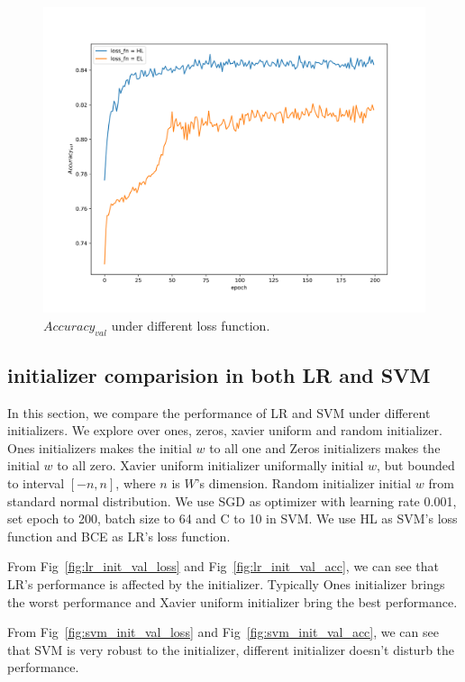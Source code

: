 \documentclass[journal, a4paper]{IEEEtran}
\begin{document}
\begin{figure}[!hbt]
	\begin{center}
		\includegraphics[width=\columnwidth]{l_val_acc}
		\caption{$Accuracy_{val}$ under different loss function.}
		\label{fig:l_val_acc}
	\end{center}
\end{figure} \par

\subsection{initializer comparision in both LR and SVM}
In this section, we compare the performance of LR and SVM under different initializers. We explore over ones, zeros, xavier uniform and random initializer. Ones initializers makes the initial $w$ to all one and Zeros initializers makes the initial $w$ to all zero. Xavier uniform initializer uniformally initial $w$, but bounded to interval $[-n, n]$, where $n$ is $W$'s dimension. Random initializer initial $w$ from standard normal distribution. We use SGD as optimizer with learning rate 0.001, set epoch to 200, batch size to 64 and C to 10 in SVM. We use HL as SVM's loss function and BCE as LR's loss function.\par
From Fig~\ref{fig:lr_init_val_loss} and Fig~\ref{fig:lr_init_val_acc}, we can see that LR's performance is affected by the initializer. Typically Ones initializer brings the worst performance and Xavier uniform initializer bring the best performance. \par
From Fig~\ref{fig:svm_init_val_loss} and Fig~\ref{fig:svm_init_val_acc}, we can see that SVM is very robust to the initializer, different initializer doesn't disturb the performance. \par
\end{document}

